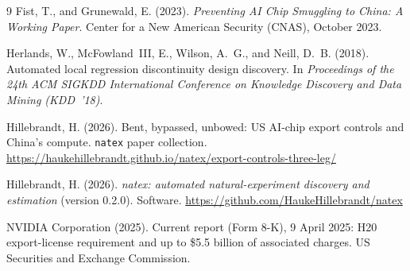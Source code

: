 \documentclass[11pt]{article}
\newcommand{\natex}{\texttt{natex}}
\begin{document}
\begin{thebibliography}{9}
Fist, T., and Grunewald, E. (2023).
\emph{Preventing AI Chip Smuggling to China: A Working Paper}.
Center for a New American Security (CNAS), October 2023.

Herlands, W., McFowland~III, E., Wilson, A.~G., and Neill, D.~B. (2018).
Automated local regression discontinuity design discovery.
In \emph{Proceedings of the 24th ACM SIGKDD International Conference on
Knowledge Discovery and Data Mining (KDD~'18)}.

Hillebrandt, H. (2026).
Bent, bypassed, unbowed: US AI-chip export controls and China's compute.
\natex{} paper collection.
\url{https://haukehillebrandt.github.io/natex/export-controls-three-leg/}

Hillebrandt, H. (2026).
\emph{natex: automated natural-experiment discovery and estimation} (version
0.2.0). Software.
\url{https://github.com/HaukeHillebrandt/natex}

NVIDIA Corporation (2025).
Current report (Form 8-K), 9 April 2025: H20 export-license requirement and
up to \$5.5 billion of associated charges.
US Securities and Exchange Commission.

\end{thebibliography}
\end{document}
